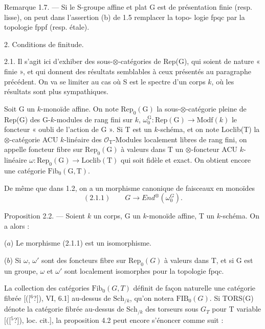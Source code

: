 \documentclass[11pt]{article}
\newcommand{\scanpage}[1]{\par\bigskip\noindent{\small\sffamily[scan #1]}\par}
\newcommand{\mspage}[1]{{\small\sffamily[p.\,#1]}}
\newcommand{\hand}[1]{\textcolor{blue}{#1}}
\newcommand{\unsure}[1]{[#1?]}
\begin{document}
Remarque 1.7. --- Si le S-groupe affine et plat G est de présentation
finie (resp. lisse), on peut dans l'assertion (b) de 1.5 remplacer la topo-%
logie fpqc par la topologie fppf (resp. étale).

2. Conditions de finitude.

2.1. Il s'agit ici d'exhiber des sous-$\otimes$-catégories de Rep(G), qui soient
de nature « finie », et qui donnent des résultats semblables à ceux présentés
au paragraphe précédent. On va se limiter au cas où S est le spectre d'un
corps $k$, où les résultats sont plus sympathiques.

Soit G un $k$-monoïde affine. On note $\mathrm{Rep}_0(\mathrm{G})$ la sous-$\otimes$-catégorie pleine
de Rep(G) des G-$k$-modules de rang fini sur $k$, $\omega_0^{\mathrm{G}}:\mathrm{Rep}(\mathrm{G})\to\mathrm{Modf}(k)$
le foncteur « oubli de l'action de G ». Si T est un $k$-schéma, et on note
Loclib(T) la $\otimes$-catégorie ACU $k$-linéaire des $\mathcal{O}_{\mathrm{T}}$-Modules localement libres
de rang fini, on appelle foncteur fibre sur $\mathrm{Rep}_0(\mathrm{G})$ à valeurs dans T un
$\otimes$-foncteur ACU $k$-linéaire $\omega:\mathrm{Rep}_0(\mathrm{G})\to\mathrm{Loclib}(\mathrm{T})$ qui soit fidèle et
exact. On obtient encore une catégorie $\mathrm{Fib}_0(\mathrm{G},\mathrm{T})$.

\mspage{\hand{70}}

\clearpage
\scanpage{119/71}
\mspage{( 3 )}

De même que dans 1.2, on a un morphisme canonique de faisceaux
en monoïdes
\[ (2.1.1) \qquad G \to End^{\otimes}(\omega_0^G). \]

Proposition 2.2. --- Soient $k$ un corps, G un $k$-monoïde affine, T un
$k$-schéma. On a alors :

($a$) Le morphisme (2.1.1) est un isomorphisme.

($b$) Si $\omega$, $\omega'$ sont des foncteurs fibre sur $\mathrm{Rep}_0(G)$ à valeurs dans T, et
si G est un groupe, $\omega$ et $\omega'$ sont localement isomorphes pour la topologie fpqc.

La collection des catégories $\mathrm{Fib}_0(G, T)$ définit de façon naturelle une
catégorie fibrée [(\unsure{${}^6$}), VI, 6.1] au-dessus de $\mathrm{Sch}_{/k}$, qu'on notera $\mathrm{FIB}_0(G)$.
Si TORS(G) dénote la catégorie fibrée au-dessus de $\mathrm{Sch}_{/k}$ des torseurs
sous $G_T$ pour T variable [(\unsure{${}^5$}), loc. cit.], la proposition 4.2 peut encore
s'énoncer comme suit :
\end{document}
